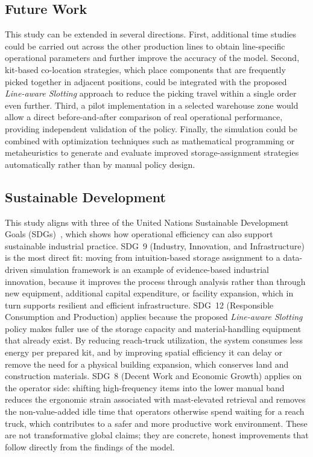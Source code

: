 \documentclass[12pt,a4paper]{article}
\newcommand{\policy}[1]{\textit{#1}}
\begin{document}
\subsection{Future Work}
This study can be extended in several directions. First, additional time
studies could be carried out across the other production lines to obtain
line-specific operational parameters and further improve the accuracy of the
model. Second, kit-based co-location strategies, which place components that
are frequently picked together in adjacent positions, could be integrated with
the proposed \policy{Line-aware Slotting} approach to reduce the picking travel
within a single order even further. Third, a pilot implementation in a
selected warehouse zone would allow a direct before-and-after comparison of
real operational performance, providing independent validation of the policy.
Finally, the simulation could be combined with optimization techniques such as
mathematical programming or metaheuristics to generate and evaluate improved
storage-assignment strategies automatically rather than by manual policy
design.

\subsection{Sustainable Development}
This study aligns with three of the United Nations Sustainable Development
Goals (SDGs)~\cite{un_sdg}, which shows how operational efficiency can also
support sustainable industrial practice. SDG~9 (Industry, Innovation, and
Infrastructure) is the most direct fit: moving from intuition-based storage
assignment to a data-driven simulation framework is an example of
evidence-based industrial innovation, because it improves the process through
analysis rather than through new equipment, additional capital expenditure, or
facility expansion, which in turn supports resilient and efficient
infrastructure. SDG~12 (Responsible Consumption and Production) applies because
the proposed \policy{Line-aware Slotting} policy makes fuller use of the
storage capacity and material-handling equipment that already exist. By
reducing reach-truck utilization, the system consumes less energy per prepared
kit, and by improving spatial efficiency it can delay or remove the need for a
physical building expansion, which conserves land and construction materials.
SDG~8 (Decent Work and Economic Growth) applies on the operator side: shifting
high-frequency items into the lower manual band reduces the ergonomic strain
associated with mast-elevated retrieval and removes the non-value-added idle
time that operators otherwise spend waiting for a reach truck, which
contributes to a safer and more productive work environment. These are not
transformative global claims; they are concrete, honest improvements that
follow directly from the findings of the model.
\end{document}
